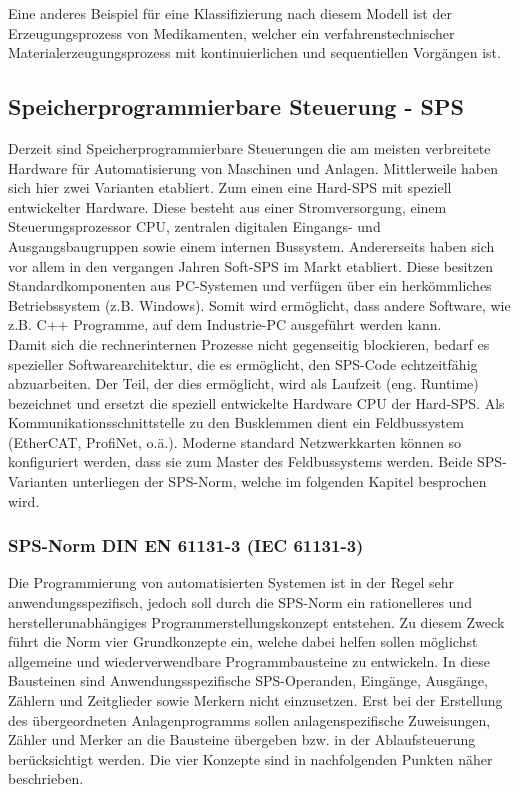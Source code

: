 Eine anderes Beispiel für eine Klassifizierung nach diesem Modell ist der Erzeugungsprozess von Medikamenten, welcher ein verfahrenstechnischer Materialerzeugungsprozess mit kontinuierlichen und sequentiellen Vorgängen ist.   



\subsection{Speicherprogrammierbare Steuerung - SPS}

Derzeit sind Speicherprogrammierbare Steuerungen die am meisten verbreitete Hardware für Automatisierung von Maschinen und Anlagen. Mittlerweile haben sich hier zwei Varianten etabliert. Zum einen eine Hard-SPS mit speziell entwickelter Hardware. Diese besteht aus einer Stromversorgung, einem Steuerungsprozessor CPU, zentralen digitalen Eingangs- und Ausgangsbaugruppen sowie einem internen Bussystem. Andererseits haben sich vor allem in den vergangen Jahren Soft-SPS  im Markt etabliert. Diese besitzen Standardkomponenten aus PC-Systemen und verfügen über ein herkömmliches Betriebssystem (z.B. Windows). Somit wird ermöglicht, dass andere Software, wie z.B. C++ Programme, auf dem Industrie-PC ausgeführt werden kann.\\
Damit sich die rechnerinternen Prozesse nicht gegenseitig blockieren, bedarf es spezieller Softwarearchitektur, die es ermöglicht, den SPS-Code echtzeitfähig abzuarbeiten. Der Teil, der dies ermöglicht, wird als Laufzeit (eng. Runtime) bezeichnet und ersetzt die speziell entwickelte Hardware CPU der Hard-SPS. Als Kommunikationsschnittstelle zu den Busklemmen dient ein Feldbussystem (EtherCAT, ProfiNet, o.ä.). Moderne standard Netzwerkkarten können so konfiguriert werden, dass sie zum Master des Feldbussystems werden. Beide SPS-Varianten unterliegen der SPS-Norm, welche im folgenden Kapitel besprochen wird.  

\subsubsection{SPS-Norm DIN EN 61131-3 (IEC 61131-3)}

Die Programmierung von automatisierten Systemen ist in der Regel sehr anwendungsspezifisch, jedoch soll durch die SPS-Norm ein rationelleres und herstellerunabhängiges Programmerstellungskonzept entstehen. Zu diesem Zweck führt die Norm vier Grundkonzepte ein, welche dabei helfen sollen möglichst allgemeine und wiederverwendbare Programmbausteine zu entwickeln. In diese Bausteinen sind Anwendungsspezifische SPS-Operanden, Eingänge, Ausgänge, Zählern und Zeitglieder sowie Merkern nicht einzusetzen. Erst bei der Erstellung des übergeordneten Anlagenprogramms sollen anlagenspezifische Zuweisungen, Zähler und Merker an die Bausteine übergeben bzw. in der Ablaufsteuerung berücksichtigt werden. Die vier Konzepte sind in nachfolgenden Punkten näher beschrieben.  

